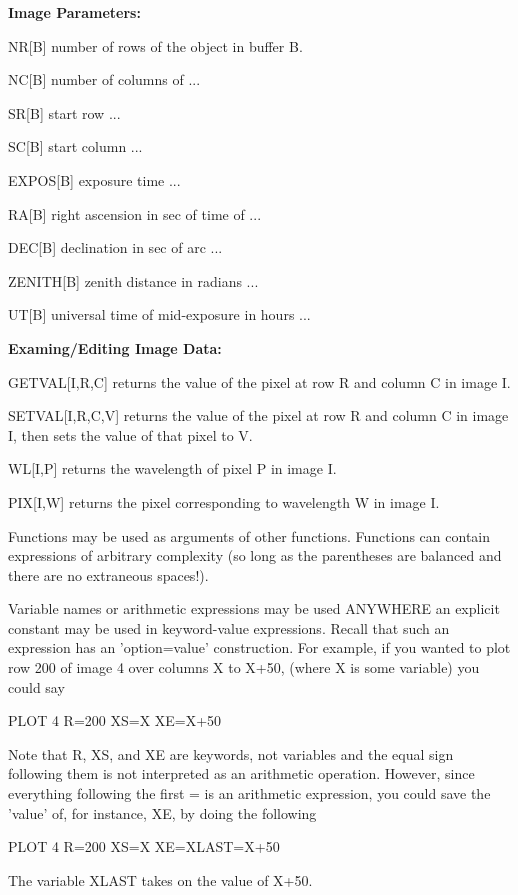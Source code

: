 \textbf{Image Parameters:}
\begin{example}
  \item[NR{[B]}\hfill]{number of rows of the object in buffer B.}
  \item[NC{[B]}\hfill]{number of columns of ...}
  \item[SR{[B]}\hfill]{start row ...}
  \item[SC{[B]}\hfill]{start column ...}
  \item[EXPOS{[B]}\hfill]{exposure time ...}
  \item[RA{[B]}\hfill]{right ascension in sec of time of ...}
  \item[DEC{[B]}\hfill]{declination in sec of arc ...}
  \item[ZENITH{[B]}\hfill]{zenith distance in radians ...}
  \item[UT{[B]}\hfill]{universal time of mid-exposure in hours ...}
\end{example}

\textbf{Examing/Editing Image Data:}
\begin{example}
  \item[GETVAL{[I,R,C]}\hfill]{returns the value of the pixel at row R and
       column C in image I.}
  \item[SETVAL{[I,R,C,V]}\hfill]{returns the value of the pixel at row R and
       column C in image I, then sets the value of that pixel to V.}
  \item[WL{[I,P]}\hfill]{returns the wavelength of pixel P in image I.}
  \item[PIX{[I,W]}\hfill]{returns the pixel corresponding to
       wavelength W in image I.}
\end{example}

Functions may be used as arguments of other functions.  Functions can
contain expressions of arbitrary complexity (so long as the parentheses are
balanced and there are no extraneous spaces!).


Variable names or arithmetic expressions may be used ANYWHERE an explicit
constant may be used in keyword-value expressions. Recall that such an
expression has an 'option=value' construction. For example, if you wanted
to plot row 200 of image 4 over columns X to X+50, (where X is some
variable) you could say
\begin{hanging}
  \item{PLOT 4 R=200 XS=X XE=X+50}
\end{hanging}
Note that R, XS, and XE are keywords, not variables and the equal sign
following them is not interpreted as an arithmetic operation.  However,
since everything following the first = is an arithmetic expression, you
could save the 'value' of, for instance, XE, by doing the following
\begin{hanging}
  \item{PLOT 4 R=200 XS=X XE=XLAST=X+50}
\end{hanging}
The variable XLAST takes on the value of X+50.

